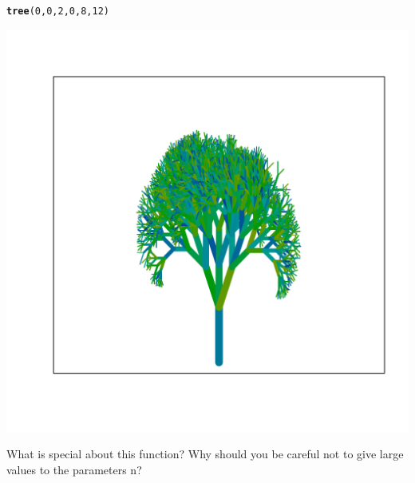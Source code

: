 \documentclass[12pt,a4paper]{scrartcl}\usepackage[]{graphicx}\usepackage[]{color}
\makeatletter
\def\maxwidth{ %
  \ifdim\Gin@nat@width>\linewidth
    \linewidth
  \else
    \Gin@nat@width
  \fi
}
\newcommand{\hlnum}[1]{\textcolor[rgb]{0.686,0.059,0.569}{#1}}%
\newcommand{\hlstd}[1]{\textcolor[rgb]{0.345,0.345,0.345}{#1}}%
\newcommand{\hlkwd}[1]{\textcolor[rgb]{0.737,0.353,0.396}{\textbf{#1}}}%
\newenvironment{kframe}{%
 \def\at@end@of@kframe{}%
 \ifinner\ifhmode%
  \def\at@end@of@kframe{\end{minipage}}%
  \begin{minipage}{\columnwidth}%
 \fi\fi%
 \def\FrameCommand##1{\hskip\@totalleftmargin \hskip-\fboxsep
 \colorbox{shadecolor}{##1}\hskip-\fboxsep
     \hskip-\linewidth \hskip-\@totalleftmargin \hskip\columnwidth}%
 \MakeFramed {\advance\hsize-\width
   \@totalleftmargin\z@ \linewidth\hsize
   \@setminipage}}%
 {\par\unskip\endMakeFramed%
 \at@end@of@kframe}
\newenvironment{knitrout}{}{} %
\makeatother
\begin{document}
\begin{Exercise}[difficulty=2, title={What does this function do?}]
\begin{knitrout}
\begin{kframe}
\begin{alltt}
\hlkwd{tree}\hlstd{(}\hlnum{0}\hlstd{,}\hlnum{0}\hlstd{,}\hlnum{2}\hlstd{,}\hlnum{0}\hlstd{,}\hlnum{8}\hlstd{,}\hlnum{12}\hlstd{)}
\end{alltt}
\end{kframe}
\includegraphics[width=\maxwidth]{figure/unnamed-chunk-12-1} 

\end{knitrout}

What is special about this function? Why should you be careful not to give large values to the parameters n? 
\end{Exercise}
\end{document}
